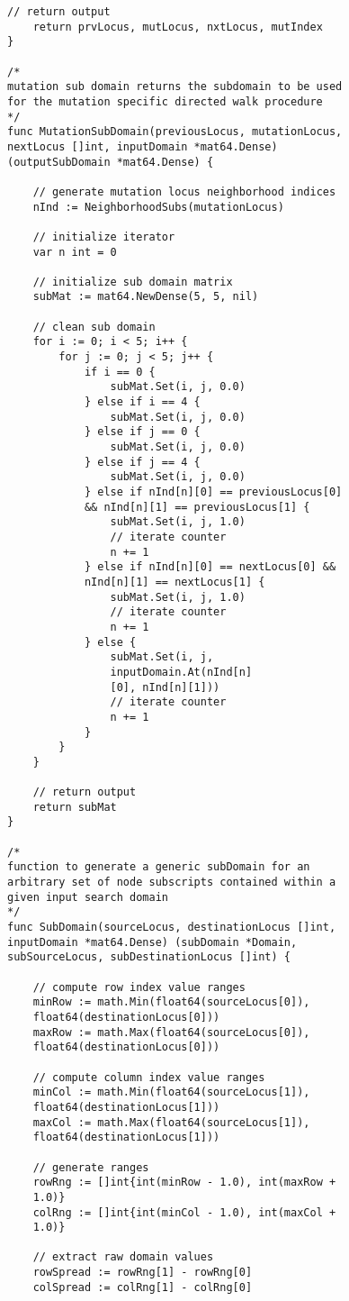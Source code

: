 \begin{lstlisting}[basicstyle=\small]
	// return output
	return prvLocus, mutLocus, nxtLocus, mutIndex
}

/* 
mutation sub domain returns the subdomain to be used 
for the mutation specific directed walk procedure
*/
func MutationSubDomain(previousLocus, mutationLocus, 
nextLocus []int, inputDomain *mat64.Dense) 
(outputSubDomain *mat64.Dense) {

	// generate mutation locus neighborhood indices
	nInd := NeighborhoodSubs(mutationLocus)

	// initialize iterator
	var n int = 0

	// initialize sub domain matrix
	subMat := mat64.NewDense(5, 5, nil)

	// clean sub domain
	for i := 0; i < 5; i++ {
		for j := 0; j < 5; j++ {
			if i == 0 {
				subMat.Set(i, j, 0.0)
			} else if i == 4 {
				subMat.Set(i, j, 0.0)
			} else if j == 0 {
				subMat.Set(i, j, 0.0)
			} else if j == 4 {
				subMat.Set(i, j, 0.0)
			} else if nInd[n][0] == previousLocus[0] 
			&& nInd[n][1] == previousLocus[1] {
				subMat.Set(i, j, 1.0)
				// iterate counter
				n += 1
			} else if nInd[n][0] == nextLocus[0] && 
			nInd[n][1] == nextLocus[1] {
				subMat.Set(i, j, 1.0)
				// iterate counter
				n += 1
			} else {
				subMat.Set(i, j, 
				inputDomain.At(nInd[n]
				[0], nInd[n][1]))
				// iterate counter
				n += 1
			}
		}
	}

	// return output
	return subMat
}

/* 
function to generate a generic subDomain for an 
arbitrary set of node subscripts contained within a 
given input search domain
*/
func SubDomain(sourceLocus, destinationLocus []int, 
inputDomain *mat64.Dense) (subDomain *Domain, 
subSourceLocus, subDestinationLocus []int) {

	// compute row index value ranges
	minRow := math.Min(float64(sourceLocus[0]), 
	float64(destinationLocus[0]))
	maxRow := math.Max(float64(sourceLocus[0]), 
	float64(destinationLocus[0]))

	// compute column index value ranges
	minCol := math.Min(float64(sourceLocus[1]), 
	float64(destinationLocus[1]))
	maxCol := math.Max(float64(sourceLocus[1]), 
	float64(destinationLocus[1]))

	// generate ranges
	rowRng := []int{int(minRow - 1.0), int(maxRow + 
	1.0)}
	colRng := []int{int(minCol - 1.0), int(maxCol + 
	1.0)}

	// extract raw domain values
	rowSpread := rowRng[1] - rowRng[0]
	colSpread := colRng[1] - colRng[0]


\end{lstlisting}
